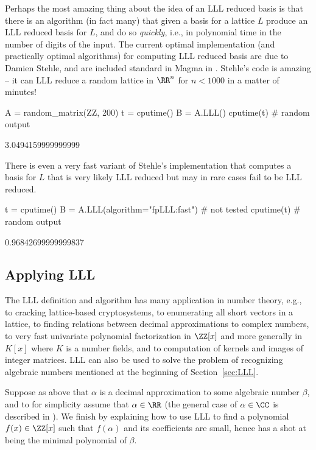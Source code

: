 Perhaps the most amazing thing about the idea of an LLL
reduced basis is that there is an algorithm (in fact many)
that given a basis for a lattice $L$ produce an LLL reduced
basis for $L$, and do so {\em quickly}, i.e., in polynomial
time in the number of digits of the input.   The current
optimal implementation (and practically optimal algorithms)
for computing LLL reduced basis are due to Damien Stehle,
and are included standard in Magma in {\Sage}.   Stehle's code
is amazing -- it can LLL reduce a random lattice in $\RR^{n}$
for $n<1000$ in a matter of minutes!
\begin{sagecode}
\begin{sagecell}
A = random_matrix(ZZ, 200)
t = cputime()
B = A.LLL()
cputime(t)     # random output
\end{sagecell}
\begin{sageout}
3.0494159999999999
\end{sageout}
\end{sagecode}

\noindent{}There is even a very fast variant of Stehle's implementation that computes a basis for $L$ that is very likely LLL reduced but may in rare
cases fail to be LLL reduced.

\begin{sagecode}
\begin{sagecell}
t = cputime()
B = A.LLL(algorithm="fpLLL:fast")   # not tested
cputime(t)      # random output
\end{sagecell}
\begin{sageout}
0.96842699999999837
\end{sageout}
\end{sagecode}

\subsection{Applying LLL}

The LLL definition and algorithm has many application in
number theory, e.g., to cracking lattice-based cryptosystems,
to enumerating all short vectors in a lattice, to finding relations
between decimal approximations to complex numbers, to very
fast univariate polynomial factorization in $\ZZ[x]$ and more
generally in $K[x]$ where $K$ is a number fields, and to
computation of kernels and images of integer matrices.  LLL
can also be used to solve the problem of recognizing algebraic
numbers mentioned at the beginning of Section~\ref{sec:LLL}.

Suppose as above that $\alpha$ is a decimal approximation
to some algebraic number $\beta$, and to for simplicity
assume that $\alpha\in\RR$ (the general case of $\alpha \in \CC$
is described in \cite{cohen:course_ant}).
We finish by explaining how to use LLL to find a polynomial
$f(x) \in \ZZ[x]$ such that $f(\alpha)$ and its coefficients
are small, hence has a shot at being the minimal polynomial
of $\beta$.

